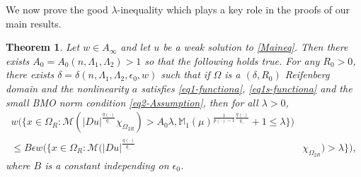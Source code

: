 \documentclass[a4paper,10pt]{amsart}
\newtheorem{thm}{Theorem}[section]
\newcommand{\Mu}{\mathbb{M}_1(\mu)}
\newcommand{\pd}{p(\cdot)}
\newcommand{\f}{\frac}
\newcommand{\Om}{\Omega}
\newcommand{\vc}{\infty}
\begin{document}
We now prove the good $\lambda$-inequality which plays a key role in the proofs  of our main results.
\begin{thm}\label{thm-goodlamdbda}
Let $w\in A_\vc$ and   let $u$ be a weak solution to \eqref{Maineq}. Then there exists $A_0=A_0(n,\Lambda_1,\Lambda_2)>1$ so that the following holds true. For any $R_0>0$, there exists $\delta=\delta(n,\Lambda_1,\Lambda_2,\epsilon_0,w)$ such that if $\Om$ is a $(\delta,R_0)$ Reifenberg domain and the nonlinearity $a$ satisfies \eqref{eq1-functiona}, \eqref{eq1s-functiona} and the small BMO norm condition \eqref{eq2-Assumption}, then for all $\lambda>0$,
$$
\begin{aligned}
w\Big(\Big\{x\in \Om_{R}:\mathcal{M}(|Du|^{\f{q(\cdot)}{q_-}}\chi_{\Om_{2R}})>A_0\lambda,  \Mu^{\f{1}{\pd-1}\f{q(\cdot)}{q_-}} +1\leq \lambda\Big\}\Big)\\
\leq B\epsilon w\Big(\Big\{x\in \Om_{R}:\mathcal{M}(|Du|^{\f{q(\cdot)}{q_-}}&\chi_{\Om_{2R}})>\lambda\Big\}\Big),
\end{aligned}
$$ 
where $B$ is a constant independing on $\epsilon_0$.
\end{thm}
	
\end{document}
